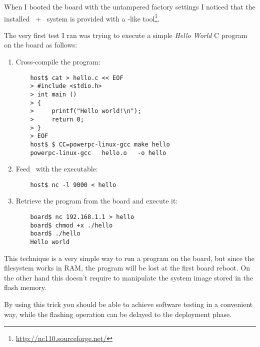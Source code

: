 When I booted the board with the untampered factory settings I noticed
that the installed \BusyBox\ + \Linux\ system is provided with a
\NetCat-like tool\footnote{\url{http://nc110.sourceforge.net/}}.

The very first test I ran was trying to execute a simple
\emph{Hello World} C program on the board as follows:
\begin{enumerate}

    \item   Cross-compile the program:

\begin{lstlisting}
    host$ cat > hello.c << EOF
    > #include <stdio.h>
    > int main ()
    > {
    >     printf("Hello world!\n");
    >     return 0;
    > }
    > EOF
    host$ $ CC=powerpc-linux-gcc make hello
    powerpc-linux-gcc   hello.o   -o hello
\end{lstlisting}

    \item   Feed \NetCat\ with the executable:

\begin{lstlisting}
    host$ nc -l 9000 < hello
\end{lstlisting}

    \item   Retrieve the program from the board and execute it:

\begin{lstlisting}
    board$ nc 192.168.1.1 > hello
    board$ chmod +x ./hello
    board$ ./hello
    Hello world
\end{lstlisting}

\end{enumerate}


This technique is a very simple way to run a program on the board, but
since the filesystem works in RAM, the program will be lost at the first
board reboot. On the other hand this doesn't require to manipulate the
system image stored in the flash memory.

By using this trick you should be able to achieve software testing in a
convenient way, while the flashing operation can be delayed to the
deployment phase.


